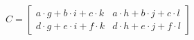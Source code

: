 \documentclass[preview]{standalone}
\begin{document}
\begin{align*}
C = \begin{bmatrix} a \cdot g + b \cdot i + c \cdot k & a \cdot h + b \cdot j + c \cdot l \\ d \cdot g + e \cdot i + f \cdot k & d \cdot h + e \cdot j + f \cdot l \end{bmatrix}
\end{align*}
\end{document}
